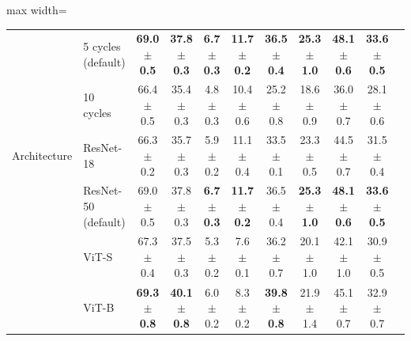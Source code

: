 \begin{table}[t]
\begin{adjustbox}{max width=\textwidth}
\begin{tabular}{l l c c c c c c c c c}
 & 5 cycles (default) & \textbf{69.0 {\scriptsize$\pm$ 0.5}} & \textbf{37.8 {\scriptsize$\pm$ 0.3}} & \textbf{6.7 {\scriptsize$\pm$ 0.3}} & \textbf{11.7 {\scriptsize$\pm$ 0.2}} & \textbf{36.5 {\scriptsize$\pm$ 0.4}} & \textbf{25.3 {\scriptsize$\pm$ 1.0}} & \textbf{48.1 {\scriptsize$\pm$ 0.6}} & \textbf{33.6 {\scriptsize$\pm$ 0.5}} \\
 & 10 cycles & 66.4 {\scriptsize$\pm$ 0.5} & 35.4 {\scriptsize$\pm$ 0.3} & 4.8 {\scriptsize$\pm$ 0.3} & 10.4 {\scriptsize$\pm$ 0.6} & 25.2 {\scriptsize$\pm$ 0.8} & 18.6 {\scriptsize$\pm$ 0.9} & 36.0 {\scriptsize$\pm$ 0.7} & 28.1 {\scriptsize$\pm$ 0.6} \\
\midrule
Architecture & ResNet-18 & 66.3 {\scriptsize$\pm$ 0.2} & 35.7 {\scriptsize$\pm$ 0.3} & 5.9 {\scriptsize$\pm$ 0.2} & 11.1 {\scriptsize$\pm$ 0.4} & 33.5 {\scriptsize$\pm$ 0.1} & 23.3 {\scriptsize$\pm$ 0.5} & 44.5 {\scriptsize$\pm$ 0.7} & 31.5 {\scriptsize$\pm$ 0.4} \\
 & ResNet-50 (default) & 69.0 {\scriptsize$\pm$ 0.5} & 37.8 {\scriptsize$\pm$ 0.3} & \textbf{6.7 {\scriptsize$\pm$ 0.3}} & \textbf{11.7 {\scriptsize$\pm$ 0.2}} & 36.5 {\scriptsize$\pm$ 0.4} & \textbf{25.3 {\scriptsize$\pm$ 1.0}} & \textbf{48.1 {\scriptsize$\pm$ 0.6}} & \textbf{33.6 {\scriptsize$\pm$ 0.5}} \\
 & ViT-S & 67.3 {\scriptsize$\pm$ 0.4} & 37.5 {\scriptsize$\pm$ 0.3} & 5.3 {\scriptsize$\pm$ 0.2} & 7.6 {\scriptsize$\pm$ 0.1} & 36.2 {\scriptsize$\pm$ 0.7} & 20.1 {\scriptsize$\pm$ 1.0} & 42.1 {\scriptsize$\pm$ 1.0} & 30.9 {\scriptsize$\pm$ 0.5} \\
 & ViT-B & \textbf{69.3 {\scriptsize$\pm$ 0.8}} & \textbf{40.1 {\scriptsize$\pm$ 0.8}} & 6.0 {\scriptsize$\pm$ 0.2} & 8.3 {\scriptsize$\pm$ 0.2} & \textbf{39.8 {\scriptsize$\pm$ 0.8}} & 21.9 {\scriptsize$\pm$ 1.4} & 45.1 {\scriptsize$\pm$ 0.7} & 32.9 {\scriptsize$\pm$ 0.7} \\
\bottomrule
\end{tabular}
\end{adjustbox}
\end{table}
